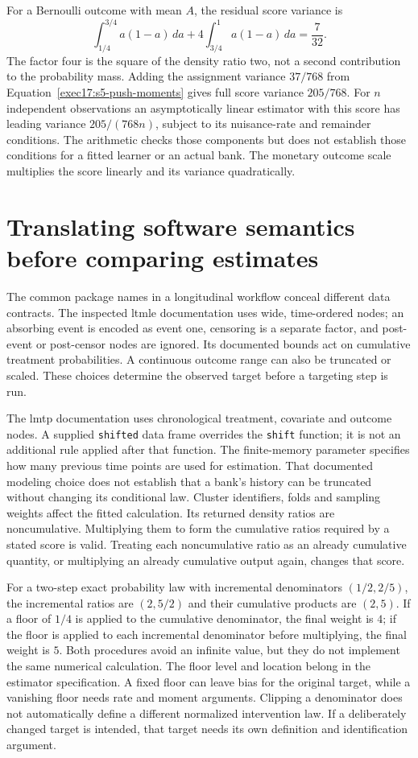 For a Bernoulli outcome with mean $A$, the residual score variance is
\[
 \int_{1/4}^{3/4}a(1-a)\,da+
 4\int_{3/4}^1a(1-a)\,da=\frac7{32}.
\]
The factor four is the square of the density ratio two, not a second
contribution to the probability mass. Adding the assignment variance
$37/768$ from Equation~\eqref{exec17:s5-push-moments} gives full score
variance $205/768$. For $n$ independent observations an asymptotically
linear estimator with this score has leading variance $205/(768n)$,
subject to its nuisance-rate and remainder conditions. The arithmetic
checks those components but does not establish those conditions for a
fitted learner or an actual bank. The monetary outcome scale multiplies
the score linearly and its variance quadratically.~\citep{exec17_s5_math}

\section{Translating software semantics before comparing estimates}
\label{exec17:s5-software}

The common package names in a longitudinal workflow conceal different data
contracts. The inspected ltmle documentation uses wide, time-ordered nodes;
an absorbing event is encoded as event one, censoring is a separate factor,
and post-event or post-censor nodes are ignored. Its documented bounds act on
cumulative treatment probabilities. A continuous outcome range can also be
truncated or scaled. These choices determine the observed target before a
targeting step is run.~\citep{sw_ltmle}

The lmtp documentation uses chronological treatment, covariate and outcome
nodes. A supplied \texttt{shifted} data frame overrides the \texttt{shift}
function; it is not an additional rule applied after that function. The
finite-memory parameter specifies how many previous time points are used
for estimation. That documented modeling choice does not establish that a
bank's history can be truncated without changing its conditional law.
Cluster identifiers, folds and sampling weights affect the fitted calculation.
Its returned density ratios are noncumulative. Multiplying them to form the
cumulative ratios required by a stated score is valid. Treating each
noncumulative ratio as an already cumulative quantity, or multiplying an
already cumulative output again, changes that score.~\citep{sw_lmtp}

For a two-step exact probability law with incremental denominators
$(1/2,2/5)$, the incremental ratios are $(2,5/2)$ and their cumulative
products are $(2,5)$. If a floor of $1/4$ is applied to the cumulative
denominator, the final weight is $4$; if the floor is applied to each
incremental denominator before multiplying, the final weight is $5$. Both
procedures avoid an infinite value, but they do not implement the same
numerical calculation. The floor level and location belong in the estimator
specification. A fixed floor can leave bias for the original target, while
a vanishing floor needs rate and moment arguments. Clipping a denominator
does not automatically define a different normalized intervention law.
If a deliberately changed target is intended, that target needs its own
definition and identification argument.~\citep{exec17_s5_math}

